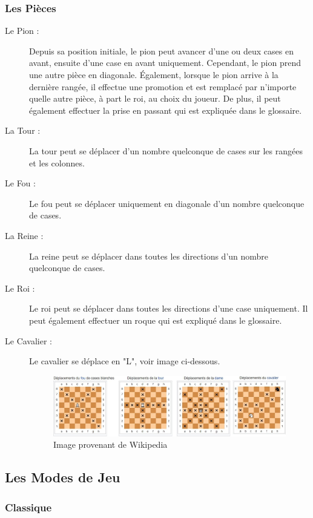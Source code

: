 \documentclass[10pt, a4paper]{article}
\begin{document}
			\subsubsection{Les Pièces}
			\begin{description}
		  \item[Le Pion :] Depuis sa position initiale, le pion peut avancer d'une ou deux cases en avant, ensuite d'une case en avant uniquement. Cependant, le pion prend une autre pièce en diagonale. Également, lorsque le pion arrive à la dernière rangée, il effectue une promotion et est remplacé par n'importe quelle autre pièce, à part le roi, au choix du joueur. De plus, il peut également effectuer la prise en passant qui est expliquée dans le glossaire.
			\item[La Tour :] La tour peut se déplacer d'un nombre quelconque de cases sur les rangées et les colonnes.
			\item[Le Fou :] Le fou peut se déplacer uniquement en diagonale d'un nombre quelconque de cases.
			\item[La Reine :] La reine peut se déplacer dans toutes les directions d'un nombre quelconque de cases.
			\item[Le Roi :] Le roi peut se déplacer dans toutes les directions d'une case uniquement. Il peut également effectuer un roque qui est expliqué dans le glossaire.
			\item[Le Cavalier :] Le cavalier se déplace en "L", voir image ci-dessous.
			\begin{figure}[bh]
			\centering
			\includegraphics[scale=0.50]{pieces_move.png}
			\caption{Image provenant de Wikipedia}
			\end{figure}
			\end{description}
			\clearpage
			
			\subsection{Les Modes de Jeu}
				\subsubsection{Classique}
\end{document}
